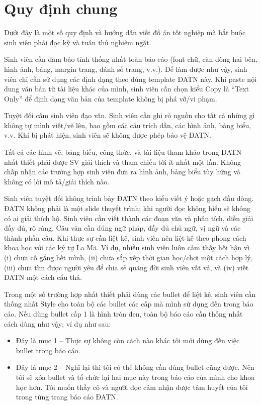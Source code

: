 \documentclass[../DoAn.tex]{subfiles}
\begin{document}
\section*{Quy định chung}
Dưới đây là một số quy định và hướng dẫn viết đồ án tốt nghiệp mà bắt buộc sinh viên phải đọc kỹ và tuân thủ nghiêm ngặt.

Sinh viên cần đảm bảo tính thống nhất toàn báo cáo (font chữ, căn dòng hai bên, hình ảnh, bảng, margin trang, đánh số trang, v.v.). Để làm được như vậy, sinh viên chỉ cần sử dụng các định dạng theo đúng template ĐATN này. Khi paste nội dung văn bản từ tài liệu khác của mình, sinh viên cần chọn kiểu Copy là “Text Only” để định dạng văn bản của template không bị phá vỡ/vi phạm.

Tuyệt đối cấm sinh viên đạo văn. Sinh viên cần ghi rõ nguồn cho tất cả những gì không tự mình viết/vẽ lên, bao gồm các câu trích dẫn, các hình ảnh, bảng biểu, v.v. Khi bị phát hiện, sinh viên sẽ không được phép bảo vệ ĐATN.

Tất cả các hình vẽ, bảng biểu, công thức, và tài liệu tham khảo trong ĐATN nhất thiết phải được SV giải thích và tham chiếu tới ít nhất một lần. Không chấp nhận các trường hợp sinh viên đưa ra hình ảnh, bảng biểu tùy hứng và không có lời mô tả/giải thích nào.

Sinh viên tuyệt đối không trình bày ĐATN theo kiểu viết ý hoặc gạch đầu dòng. ĐATN không phải là một slide thuyết trình; khi người đọc không hiểu sẽ không có ai giải thích hộ. Sinh viên cần viết thành các đoạn văn và phân tích, diễn giải đầy đủ, rõ ràng. Câu văn cần đúng ngữ pháp, đầy đủ chủ ngữ, vị ngữ và các thành phần câu.
Khi thực sự cần liệt kê, sinh viên nên liệt kê theo phong cách khoa học với các ký tự La Mã. Ví dụ, nhiều sinh viên luôn cảm thấy hối hận vì (i) chưa cố gắng hết mình, (ii) chưa sắp xếp thời gian học/chơi một cách hợp lý, (iii) chưa tìm được người yêu để chia sẻ quãng đời sinh viên vất vả, và (iv) viết ĐATN một cách cẩu thả.

Trong một số trường hợp nhất thiết phải dùng các bullet để liệt kê, sinh viên cần thống nhất Style cho toàn bộ các bullet các cấp mà mình sử dụng đến trong báo cáo. Nếu dùng bullet cấp 1 là hình tròn đen, toàn bộ báo cáo cần thống nhất cách dùng như vậy; ví dụ như sau:

\begin{itemize}
\item Đây là mục 1 – Thực sự không còn cách nào khác tôi mới dùng đến việc bullet trong báo cáo.
\item Đây là mục 2 – Nghĩ lại thì tôi có thể không cần dùng bullet cũng được. Nên tôi sẽ xóa bullet và tổ chức lại hai mục này trong báo cáo của mình cho khoa học hơn. Tôi muốn thầy cô và người đọc cảm nhận được tâm huyết của tôi trong từng trang báo cáo ĐATN.
\end{itemize}
\end{document}
